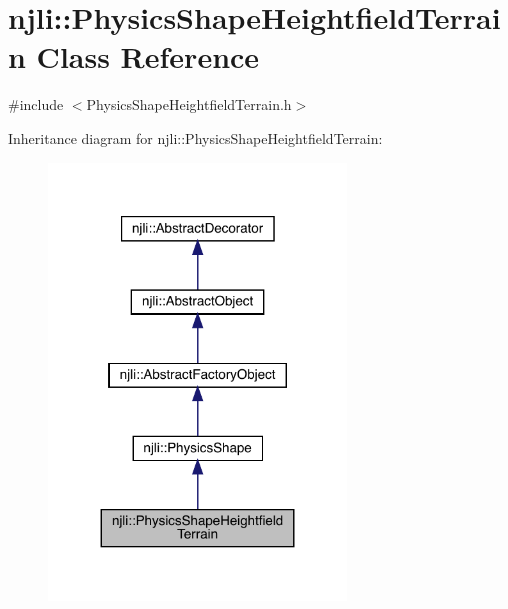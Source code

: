 \hypertarget{classnjli_1_1_physics_shape_heightfield_terrain}{}\section{njli\+:\+:Physics\+Shape\+Heightfield\+Terrain Class Reference}
\label{classnjli_1_1_physics_shape_heightfield_terrain}


{\ttfamily \#include $<$Physics\+Shape\+Heightfield\+Terrain.\+h$>$}



Inheritance diagram for njli\+:\+:Physics\+Shape\+Heightfield\+Terrain\+:\nopagebreak
\begin{figure}[H]
\begin{center}
\leavevmode
\includegraphics[width=224pt]{classnjli_1_1_physics_shape_heightfield_terrain__inherit__graph}
\end{center}
\end{figure}


